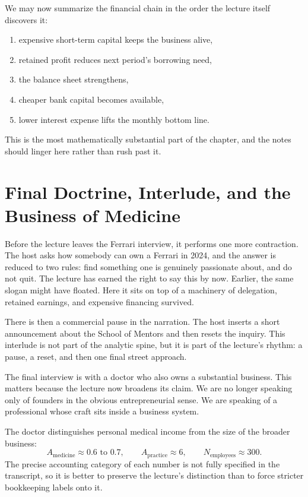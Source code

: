 We may now summarize the financial chain in the order the lecture itself discovers it:
\begin{enumerate}
\item expensive short-term capital keeps the business alive,
\item retained profit reduces next period's borrowing need,
\item the balance sheet strengthens,
\item cheaper bank capital becomes available,
\item lower interest expense lifts the monthly bottom line.
\end{enumerate}
This is the most mathematically substantial part of the chapter, and the notes should linger here rather than rush past it.

\section{Final Doctrine, Interlude, and the Business of Medicine}

Before the lecture leaves the Ferrari interview, it performs one more contraction. The host asks how somebody can own a Ferrari in 2024, and the answer is reduced to two rules: find something one is genuinely passionate about, and do not quit. The lecture has earned the right to say this by now. Earlier, the same slogan might have floated. Here it sits on top of a machinery of delegation, retained earnings, and expensive financing survived.

There is then a commercial pause in the narration. The host inserts a short announcement about the School of Mentors and then resets the inquiry. This interlude is not part of the analytic spine, but it is part of the lecture's rhythm: a pause, a reset, and then one final street approach.

The final interview is with a doctor who also owns a substantial business. This matters because the lecture now broadens its claim. We are no longer speaking only of founders in the obvious entrepreneurial sense. We are speaking of a professional whose craft sits inside a business system.

The doctor distinguishes personal medical income from the size of the broader business:
\begin{equation}
A_{\text{medicine}} \approx 0.6 \text{ to } 0.7,\qquad
A_{\text{practice}} \approx 6,\qquad
N_{\text{employees}} \approx 300.
\end{equation}
The precise accounting category of each number is not fully specified in the transcript, so it is better to preserve the lecture's distinction than to force stricter bookkeeping labels onto it.

